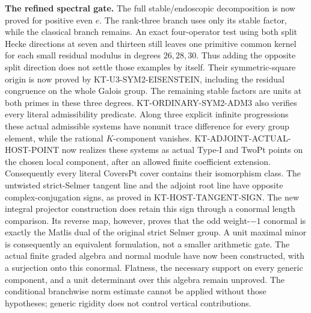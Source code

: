 \documentclass[11pt,a4paper]{article}
\theoremstyle{definition}
\renewcommand{\paragraph}[1]{\par\smallskip\noindent\textbf{#1}\quad\ignorespaces}
\begin{document}
\paragraph{The refined spectral gate.}
The full stable/endoscopic decomposition is now proved for positive
even $e$. The rank-three branch uses only its stable factor, while
the classical branch remains. An exact four-operator test using
both split Hecke directions at seven and thirteen still leaves
one primitive common kernel for each small residual modulus in
degrees $26,28,30$. Thus adding the opposite split direction does
not settle those examples by itself. Their symmetric-square
origin is now proved by KT-U3-SYM2-EISENSTEIN, including the
residual congruence on the whole Galois group. The remaining
stable factors are units at both primes in these three degrees.
KT-ORDINARY-SYM2-ADM3 also verifies every literal admissibility
predicate. Along three explicit infinite progressions these
actual admissible systems have nonunit trace difference for
every group element, while the rational $K$-component vanishes.
KT-ADJOINT-ACTUAL-HOST-POINT now realizes these systems as
actual Type-I and TwoPt points on the chosen local component,
after an allowed finite coefficient extension. Consequently
every literal CoversPt cover contains their isomorphism class.
The untwisted strict-Selmer tangent line and the adjoint root
line have opposite complex-conjugation signs, as proved in
KT-HOST-TANGENT-SIGN. The new integral projector construction
does retain this sign through a conormal length comparison.
Its reverse map, however, proves that the odd weight-$-1$
conormal is exactly the Matlis dual of the original strict
Selmer group. A unit maximal minor is consequently an
equivalent formulation, not a smaller arithmetic gate.
The actual finite graded algebra and normal module have now
been constructed, with a surjection onto this conormal.
Flatness, the necessary support on every generic component,
and a unit determinant over this algebra remain unproved.
The conditional branchwise norm estimate cannot be applied
without those hypotheses; generic rigidity does not control
vertical contributions.
\end{document}
